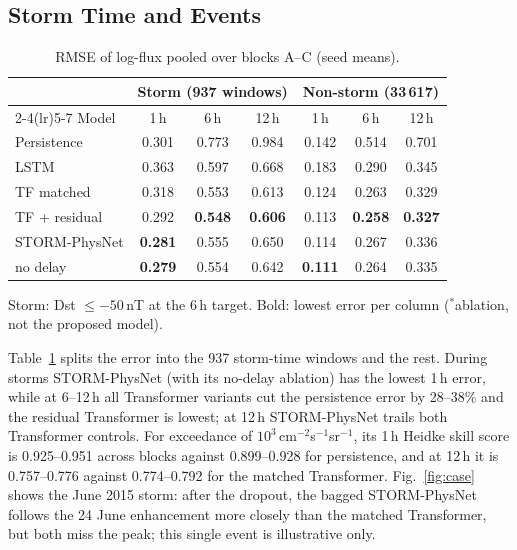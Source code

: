 \documentclass[conference,a4paper]{IEEEtran}
\begin{document}
\subsection{Storm Time and Events}
\begin{table}[!t]
\centering
\caption{RMSE of log-flux pooled over blocks A--C (seed means).}
\label{tab:storm}
\setlength{\tabcolsep}{3pt}
\footnotesize
\begin{tabular}{lcccccc}
\toprule
 & \multicolumn{3}{c}{Storm (937 windows)} & \multicolumn{3}{c}{Non-storm (33\,617)} \\
\cmidrule(lr){2-4}\cmidrule(lr){5-7}
Model & 1\,h & 6\,h & 12\,h & 1\,h & 6\,h & 12\,h \\
\midrule
Persistence    & 0.301 & 0.773 & 0.984 & 0.142 & 0.514 & 0.701 \\
LSTM           & 0.363 & 0.597 & 0.668 & 0.183 & 0.290 & 0.345 \\
TF matched     & 0.318 & 0.553 & 0.613 & 0.124 & 0.263 & 0.329 \\
TF + residual  & 0.292 & \textbf{0.548} & \textbf{0.606} & 0.113 & \textbf{0.258} & \textbf{0.327} \\
STORM-PhysNet  & \textbf{0.281} & 0.555 & 0.650 & 0.114 & 0.267 & 0.336 \\
\quad no delay & \textbf{0.279}\rlap{\(^*\)} & 0.554 & 0.642 & \textbf{0.111} & 0.264 & 0.335 \\
\bottomrule
\end{tabular}

\vspace{0.5ex}
{\footnotesize \raggedright Storm: Dst \(\le-50\)\,nT at the 6\,h target.
Bold: lowest error per column (\(^*\)ablation, not the proposed model).\par}
\end{table}

Table~\ref{tab:storm} splits the error into the 937 storm-time windows and
the rest. During storms STORM-PhysNet (with its no-delay ablation) has the
lowest 1\,h error, while at 6--12\,h all Transformer variants cut the
persistence error by 28--38\% and the residual Transformer is lowest; at 12\,h
STORM-PhysNet trails both Transformer controls. For
exceedance of \(10^{3}\)\,cm\(^{-2}\)s\(^{-1}\)sr\(^{-1}\), its 1\,h Heidke skill
score is 0.925--0.951 across blocks against 0.899--0.928 for persistence, and
at 12\,h it is 0.757--0.776 against 0.774--0.792 for the matched Transformer.
Fig.~\ref{fig:case} shows the June 2015 storm: after the dropout, the bagged
STORM-PhysNet follows the 24 June enhancement more closely than the matched
Transformer, but both miss the peak; this single event is illustrative only.
\end{document}
